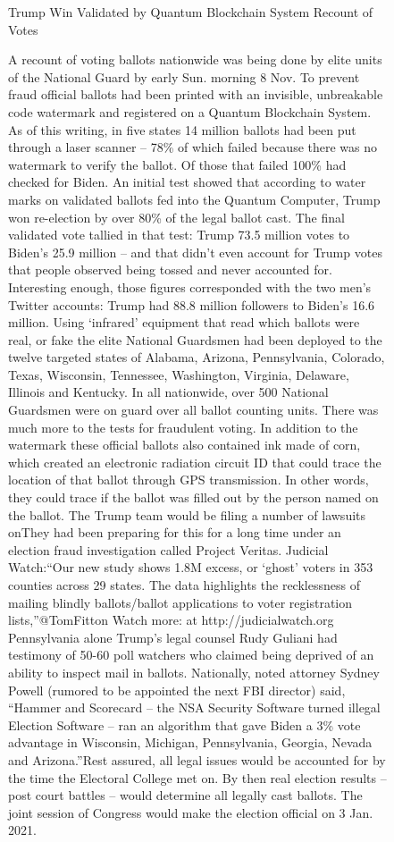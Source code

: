 \begin{figure}[htbp]
    \centering
    \begin{minipage}{0.9\linewidth}
        \begin{center}
            \small{Trump Win Validated by Quantum Blockchain System Recount of Votes}
        \end{center}
        \scriptsize{
            A recount of voting ballots nationwide was being done by elite units of the National Guard by early Sun. morning 8 Nov. To prevent fraud official ballots had been printed with an invisible, unbreakable code watermark and registered on a Quantum Blockchain System. As of this writing, in five states 14 million ballots had been put through a laser scanner – 78\% of which failed because there was no watermark to verify the ballot. Of those that failed 100\% had checked for Biden. An initial test showed that according to water marks on validated ballots fed into the Quantum Computer, Trump won re-election by over 80\% of the legal ballot cast. The final validated vote tallied in that test: Trump 73.5 million votes to Biden’s 25.9 million – and that didn’t even account for Trump votes that people observed being tossed and never accounted for. Interesting enough, those figures corresponded with the two men’s Twitter accounts: Trump had 88.8 million followers to Biden’s 16.6 million. Using ‘infrared’ equipment that read which ballots were real, or fake the elite National Guardsmen had been deployed to the twelve targeted states of Alabama, Arizona, Pennsylvania, Colorado, Texas, Wisconsin, Tennessee, Washington, Virginia, Delaware, Illinois and Kentucky. In all nationwide, over 500 National Guardsmen were on guard over all ballot counting units. There was much more to the tests for fraudulent voting. In addition to the watermark these official ballots also contained ink made of corn, which created an electronic radiation circuit ID that could trace the location of that ballot through GPS transmission. In other words, they could trace if the ballot was filled out by the person named on the ballot. The Trump team would be filing a number of lawsuits onThey had been preparing for this for a long time under an election fraud investigation called Project Veritas. Judicial Watch:“Our new study shows 1.8M excess, or ‘ghost’ voters in 353 counties across 29 states. The data highlights the recklessness of mailing blindly ballots/ballot applications to voter registration lists,”@TomFitton Watch more: at http://judicialwatch.org Pennsylvania alone Trump’s legal counsel Rudy Guliani had testimony of 50-60 poll watchers who claimed being deprived of an ability to inspect mail in ballots. Nationally, noted attorney Sydney Powell (rumored to be appointed the next FBI director) said, “Hammer and Scorecard – the NSA Security Software turned illegal Election Software – ran an algorithm that gave Biden a 3\% vote advantage in Wisconsin, Michigan, Pennsylvania, Georgia, Nevada and Arizona.”Rest assured, all legal issues would be accounted for by the time the Electoral College met on. By then real election results – post court battles – would determine all legally cast ballots. The joint session of Congress would make the election official on 3 Jan. 2021.}

\end{minipage}
\end{figure}
